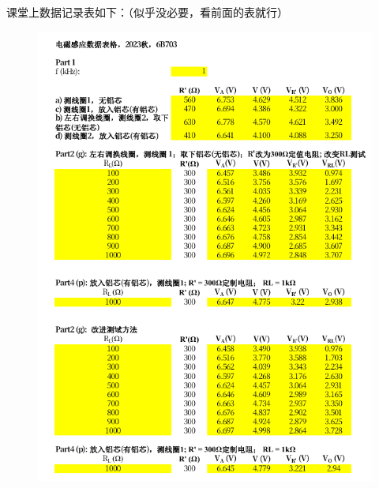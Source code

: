 \documentclass[12pt]{article}
\begin{document}
\clearpage
课堂上数据记录表如下：（似乎没必要，看前面的表就行）
\begin{figure}[H]
    \centering
    \includegraphics{Screenshot.png}
\end{figure}
\end{document}
